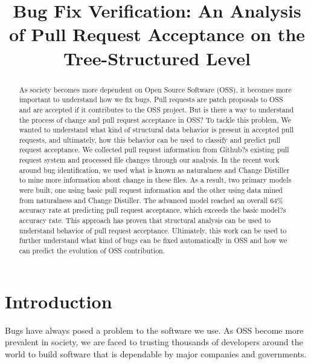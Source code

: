 \documentclass[10pt, conference]{IEEEtran}
\begin{document}
%
\title{Bug Fix Verification: An Analysis of Pull Request Acceptance on the Tree-Structured Level}



\author{
}
\maketitle


\begin{abstract}
As society becomes more dependent on Open Source Software (OSS), it becomes more important to understand how we fix bugs. Pull requests are patch proposals to OSS and are accepted if it contributes to the OSS project. But is there a way to understand the process of change and pull request acceptance in OSS? To tackle this problem, We wanted to understand what kind of structural data behavior is present in accepted pull requests, and ultimately, how this behavior can be used to classify and predict pull request acceptance. We collected pull request information from Github?s existing pull request system and processed file changes through our analysis. In the recent work around bug identification, we used what is known as naturalness and Change Distiller to mine more information about change in these files. As a result, two primary models were built, one using basic pull request information and the other using data mined from naturalness and Change Distiller. The advanced model reached an overall 64\% accuracy rate at predicting pull request acceptance, which exceeds the basic model?s accuracy rate. This approach has proven that structural analysis can be used to understand behavior of pull request acceptance. Ultimately, this work can be used to further understand what kind of bugs can be fixed automatically in OSS and how we can predict the evolution of OSS contribution.
\end{abstract}
\IEEEpeerreviewmaketitle

\section{Introduction}
Bugs have always posed a problem to the software we use. As OSS become more prevalent in society, we are faced to trusting thousands of developers around the world to build software that is dependable by major companies and governments. 
\end{document}
